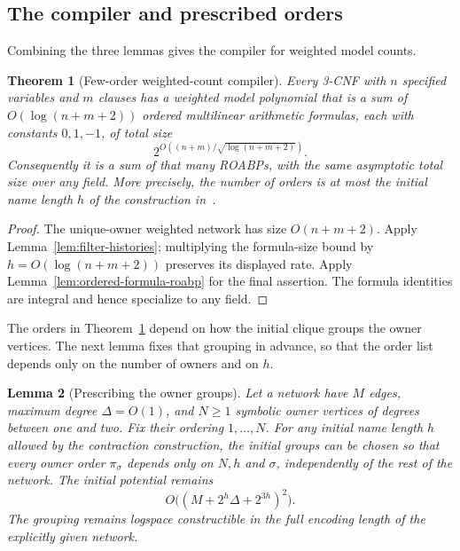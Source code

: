 \documentclass[11pt]{article}
\newtheorem{theorem}{Theorem}[section]
\newtheorem{lemma}[theorem]{Lemma}
\theoremstyle{definition}
\theoremstyle{remark}
\begin{document}
\subsection{The compiler and prescribed orders}

Combining the three lemmas gives the compiler for weighted model
counts.

\begin{theorem}[Few-order weighted-count compiler]
\label{thm:few-order-compiler}
Every 3-CNF with $n$ specified variables and $m$ clauses has a weighted
model polynomial that is a sum of $O(\log(n+m+2))$ ordered multilinear
arithmetic formulas, each with constants $0,1,-1$, of total size
\[
 2^{O((n+m)/\sqrt{\log(n+m+2)})}.
\]
Consequently it is a sum of that many ROABPs, with the same asymptotic
total size over any field. More precisely, the number of orders is at
most the initial name length $h$ of the construction in~\cite{Cruz26}.
\end{theorem}

\begin{proof}
The unique-owner weighted network has size $O(n+m+2)$. Apply
Lemma~\ref{lem:filter-histories}; multiplying the formula-size bound
by $h=O(\log(n+m+2))$ preserves its displayed rate. Apply
Lemma~\ref{lem:ordered-formula-roabp} for the final assertion. The
formula identities are integral and hence specialize to any field.
\end{proof}

The orders in Theorem~\ref{thm:few-order-compiler} depend on how the
initial clique groups the owner vertices. The next lemma fixes that
grouping in advance, so that the order list depends only on the number
of owners and on $h$.

\begin{lemma}[Prescribing the owner groups]
\label{lem:prescribed-owners}
Let a network have $M$ edges, maximum degree $\Delta=O(1)$, and
$N\ge1$ symbolic owner vertices of degrees between one and two.
Fix their ordering $1,\ldots,N$. For any initial name length $h$
allowed by the contraction construction, the initial groups can be
chosen so that every owner order $\pi_\sigma$ depends only on $N,h$
and $\sigma$, independently of the rest of the network. The initial
potential remains
\[
 O\bigl((M+2^h\Delta+2^{3h})^2\bigr).
\]
The grouping remains logspace constructible in the full encoding length
of the explicitly given network.
\end{lemma}
\end{document}
